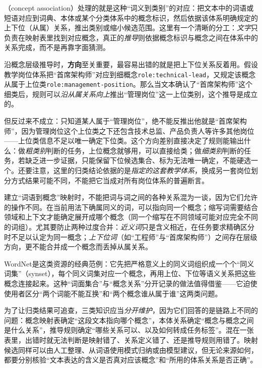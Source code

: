 （concept association）处理的就是这种“词义到类别”的对应：把文本中的词语或短语对应到词典、本体或某个分类体系中的概念标识，然后依据该体系明确规定的上下位（从属）关系，推出类别或缩小候选范围。这里有一个清晰的分工：\emph{文字}只负责在映射表里找到对应概念，真正的\emph{推导}则依据概念标识与概念之间在体系中的关系完成，而不是再靠字面猜测。

沿概念层级推导时，\textbf{方向}至关重要，最容易出错的就是把上下位关系反着用。假设教学岗位体系把“首席架构师”对应到细概念\texttt{role:\allowbreak{}technical-\allowbreak{}lead}，又规定该概念从属于上位类\texttt{role:\allowbreak{}management-\allowbreak{}position}。那么当文本确认了“首席架构师”这个细类后，规则可以\emph{沿从属关系向上}推出“管理岗位”这一上位类别，这个推导是成立的。

但反过来不成立：只知道某人属于“管理岗位”，绝不能反推出他就是“首席架构师”，因为管理岗位这个上位类之下还包含技术总监、产品负责人等许多其他岗位——上位类信息不足以唯一确定下位类。这个方向差别直接决定了规则能输出什么：做\emph{粗类别}判断的任务，上位概念就够用，可以直接给类；做\emph{细类别}判断的任务，若缺乏进一步证据，只能保留下位候选集合、标为无法唯一确定，不能硬选一个。还要注意，这里的归类结论依据的是\emph{指定的这套教学体系}，换成另一套岗位划分方式结果可能不同，不能把它当成对所有岗位体系的普遍断言。

建立“词语到概念”映射时，不能把词与词之间的各种关系混为一谈，因为它们允许的操作不同。在当前用法下确属同义的词，可以指向同一个概念；缩写词需要结合领域和上下文才能确定展开成哪个概念（同一个缩写在不同领域可能对应完全不同的词组）。尤其要防止两种过度合并：\emph{近义词}只是含义相近，在任务要求精确区分时不足以认定为同一概念；\emph{上下位词}（如“工程师”与“首席架构师”）之间存在层级方向，更不能合并成一个概念而丢掉从属关系。

WordNet是这类资源的经典范例：它先把严格意义上的同义词组织成一个个“同义词集”（synset），每个同义词集对应一个概念，再用上位、下位等语义关系把这些概念连接起来。这种“词面集合”与“概念关系”分开记录的做法值得借鉴——它迫使使用者区分“两个词能不能互换”和“两个概念谁从属于谁”这两类问题。

为了让归类结果可追查，三类知识应当\emph{分开维护}，因为它们回答的是链路上不同的问题：概念映射表确定“这段文本指向哪个概念”，本体关系确定“概念与概念之间是什么关系”，推导规则确定“哪些关系可以、以及如何转成任务标签”。混在一张表里，出错时就无法判断是映射错了、关系定义错了、还是推导规则用错了。映射候选同样可以由人工整理、从词语使用模式归纳或由模型建议，但无论来源如何，都要分别核验“文本表达的含义是否真对应该概念”和“所用的体系关系是否正确”。

